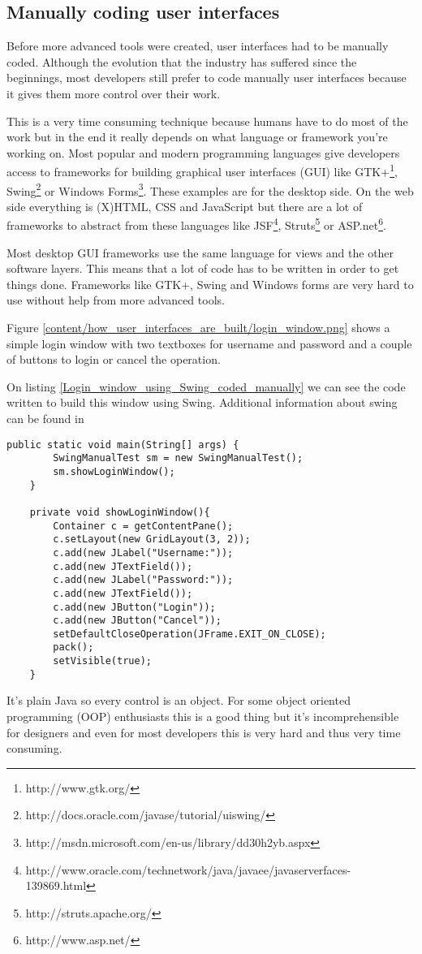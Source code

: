 \subsection{Manually coding user interfaces}
Before more advanced tools were created, user interfaces had to be manually coded. Although the evolution that the industry has suffered since the beginnings, most developers still prefer to code manually user interfaces because it gives them more control over their work.

This is a very time consuming technique because humans have to do most of the work but in the end it really depends on what language or framework you're working on. Most popular and modern programming languages give developers access to frameworks for building graphical user interfaces (GUI) like GTK+\footnote{http://www.gtk.org/}, Swing\footnote{http://docs.oracle.com/javase/tutorial/uiswing/} or Windows Forms\footnote{http://msdn.microsoft.com/en-us/library/dd30h2yb.aspx}. These examples are for the desktop side. On the web side everything is (X)HTML, CSS and JavaScript but there are a lot of frameworks to abstract from these languages like JSF\footnote{http://www.oracle.com/technetwork/java/javaee/javaserverfaces-139869.html}, Struts\footnote{http://struts.apache.org/} or ASP.net\footnote{http://www.asp.net/}.

Most desktop GUI frameworks use the same language for views and the other software layers. This means that a lot of code has to be written in order to get things done. Frameworks like GTK+, Swing and Windows forms are very hard to use without help from more advanced tools.

Figure \ref{content/how_user_interfaces_are_built/login_window.png} shows a simple login window with two textboxes for username and password and a couple of buttons to login or cancel the operation.

On listing \ref{Login_window_using_Swing_coded_manually} we can see the code written to build this window using Swing. Additional information about swing can be found in \cite{Java_Swing}

\lstset{language=Java}
\begin{lstlisting}[caption={Login window using Swing, coded manually},label=Login_window_using_Swing_coded_manually]
public static void main(String[] args) {
        SwingManualTest sm = new SwingManualTest();
        sm.showLoginWindow();
    }

    private void showLoginWindow(){
        Container c = getContentPane();
        c.setLayout(new GridLayout(3, 2));
        c.add(new JLabel("Username:"));
        c.add(new JTextField());
        c.add(new JLabel("Password:"));
        c.add(new JTextField());
        c.add(new JButton("Login"));
        c.add(new JButton("Cancel"));
        setDefaultCloseOperation(JFrame.EXIT_ON_CLOSE);
        pack();
        setVisible(true);
    }
\end{lstlisting}
It's plain Java so every control is an object. For some object oriented programming (OOP) enthusiasts this is a good thing but it's incomprehensible for designers and even for most developers this is very hard and thus very time consuming.

